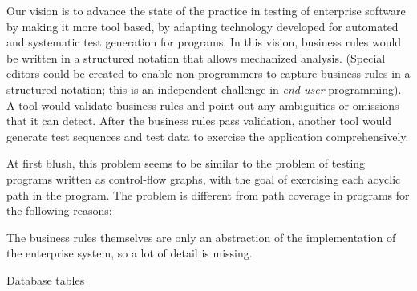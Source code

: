 Our vision is to advance the state of the practice in testing of enterprise software by making it more
tool based, by adapting technology developed for automated and systematic test generation for programs.  
In this vision, business rules would be written in a structured notation that allows mechanized analysis. 
(Special editors could be created to enable non-programmers to capture business rules in a structured notation; 
this is an independent challenge in \textit{end user} programming).  A tool would validate business rules 
and point out any ambiguities or omissions that it can detect.  After the business rules pass validation, 
another tool would generate test sequences and test data to exercise the application comprehensively.


At first blush, this problem seems to be similar to the problem of testing
programs written as control-flow graphs, with the goal of exercising each acyclic path in the 
program.  The problem is different from path coverage in programs for the following reasons:

The business rules themselves are only an abstraction of the implementation of the enterprise system,
so a lot of detail is missing.

Database tables
